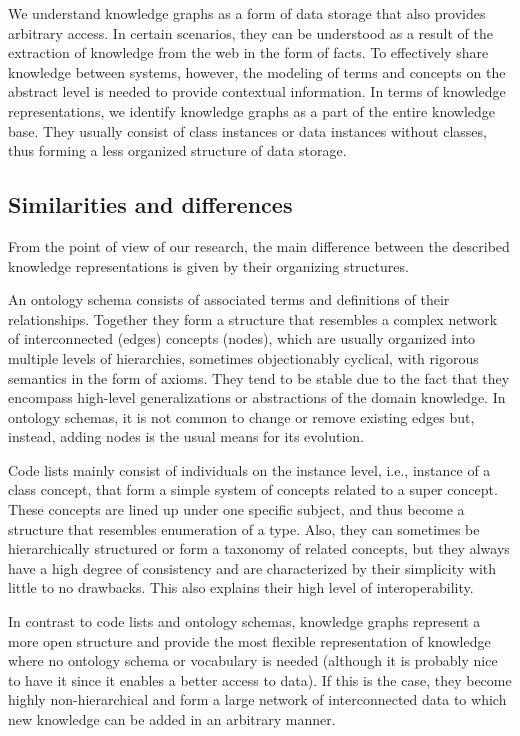 We understand knowledge graphs as a form of data storage that also provides arbitrary access. In certain scenarios, they can be understood as a result of the extraction of knowledge from the web in the form of facts. To effectively share knowledge between systems, however, the modeling of terms and concepts on the abstract level is needed to provide contextual information. In terms of knowledge representations, we identify knowledge graphs as a part of the entire knowledge base. They usually consist of class instances or data instances without classes, thus forming a less organized structure of data storage.

\subsection{Similarities and differences}
From the point of view of our research, the main difference between the described knowledge representations is given by their organizing structures. 

An ontology schema consists of associated terms and definitions of their relationships. Together they form a structure that resembles a complex network of interconnected (edges) concepts (nodes), which are usually organized into multiple levels of hierarchies, sometimes objectionably cyclical, with rigorous semantics in the form of axioms. They tend to be stable due to the fact that they encompass high-level generalizations or abstractions of the domain knowledge. In ontology schemas, it is not common to change or remove existing edges but, instead, adding nodes is the usual means for its evolution.

Code lists mainly consist of individuals on the instance level, i.e., instance of a class concept, that form a simple system of concepts related to a super concept. These concepts are lined up under one specific subject, and thus become a structure that resembles enumeration of a type. Also, they can sometimes be hierarchically structured or form a taxonomy of related concepts, but they always have a high degree of consistency and are characterized by their simplicity with little to no drawbacks. This also explains their high level of interoperability.

In contrast to code lists and ontology schemas, knowledge graphs represent a more open structure and provide the most flexible representation of knowledge where no ontology schema or vocabulary is needed (although it is probably  nice to have it since it enables a better access to data). If this is the case, they become highly non-hierarchical and form a large network of interconnected data to which new knowledge can be added in an arbitrary manner.